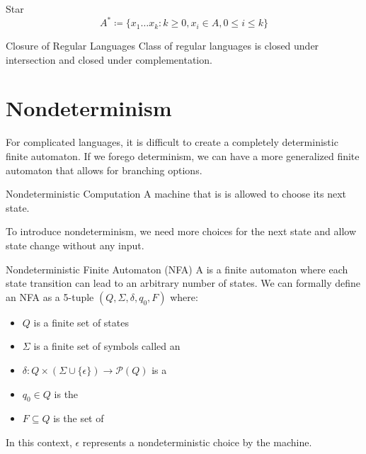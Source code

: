 \documentclass[12pt]{report}
\begin{document}
\begin{dfnbox}{Star}{}
    \[ A^* \coloneq \{ x_1 \ldots x_k : k \geq 0, x_i \in A, 0 \leq i \leq k \} \]
\end{dfnbox}

\begin{thmbox}{Closure of Regular Languages}{}
    Class of regular languages is closed under intersection and closed under complementation.
\end{thmbox}

\section{Nondeterminism}

For complicated languages, it is difficult to create a completely deterministic finite automaton. If we forego determinism, we can have a more generalized finite automaton that allows for branching options.

\begin{dfnbox}{Nondeterministic Computation}{}
    A machine that is  is allowed to choose its next state.
\end{dfnbox}

To introduce nondeterminism, we need more choices for the next state and allow state change without any input.

\begin{dfnbox}{Nondeterministic Finite Automaton (NFA)}{}
    A  is a finite automaton where each state transition can lead to an arbitrary number of states.
    \tcblower
    We can formally define an NFA as a 5-tuple $(Q, \Sigma, \delta, q_0, F)$ where:
    \begin{itemize}[noitemsep]
        \item $Q$ is a finite set of states
        \item $\Sigma$ is a finite set of symbols called an 
        \item $\delta : Q \times (\Sigma \cup \{ \epsilon\}) \to \mathcal{P}(Q)$ is a 
        \item $q_0 \in Q$ is the 
        \item $F \subseteq Q$ is the set of 
    \end{itemize}
    In this context, $\epsilon$ represents a nondeterministic choice by the machine.
\end{dfnbox}
\end{document}
